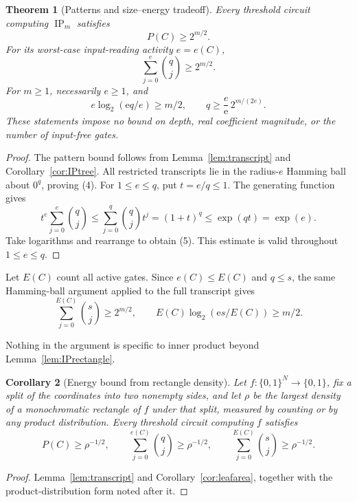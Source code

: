 \documentclass[11pt]{article}
\newtheorem{theorem}{Theorem}[section]
\newtheorem{corollary}[theorem]{Corollary}
\theoremstyle{definition}
\newcommand{\bits}{\{0,1\}}
\newcommand{\ip}{\operatorname{IP}}
\newcommand{\Eul}{\mathrm e}
\begin{document}
\begin{theorem}[Patterns and size--energy tradeoff]\label{thm:energy}
Every threshold circuit computing \(\ip_m\) satisfies
\[
 P(C)\ge2^{m/2}.
\]
For its worst-case input-reading activity \(e=e(C)\),
\[
 \boxed{\quad
 \sum_{j=0}^{e}\binom qj\ge2^{m/2}.
 \quad}                                                  \tag{4}
\]
For \(m\ge1\), necessarily \(e\ge1\), and
\[
 \boxed{\quad
 e\log_2(\Eul q/e)\ge m/2,
 \qquad q\ge\frac e{\Eul}\,2^{m/(2e)}.
 \quad}                                                  \tag{5}
\]
These statements impose no bound on depth, real coefficient magnitude, or the number of input-free gates.
\end{theorem}
\begin{proof}
The pattern bound follows from Lemma~\ref{lem:transcript} and Corollary~\ref{cor:IPtree}.
All restricted transcripts lie in the radius-\(e\) Hamming ball about \(0^q\), proving (4).
For \(1\le e\le q\), put \(t=e/q\le1\). The generating function gives
\[
 t^e\sum_{j=0}^e\binom qj
 \le\sum_{j=0}^q\binom qj t^j
 =(1+t)^q\le \exp(qt)=\exp(e).
\]
Take logarithms and rearrange to obtain (5). This estimate is valid throughout \(1\le e\le q\).
\end{proof}

Let \(E(C)\) count all active gates. Since \(e(C)\le E(C)\) and \(q\le s\), the same Hamming-ball argument applied to the full transcript gives
\[
 \sum_{j=0}^{E(C)}\binom sj\ge2^{m/2},
 \qquad E(C)\log_2(\Eul s/E(C))\ge m/2.                   \tag{6}
\]

Nothing in the argument is specific to inner product beyond Lemma~\ref{lem:IPrectangle}.

\begin{corollary}[Energy bound from rectangle density]\label{cor:energy_general}
Let \(f:\bits^N\to\bits\), fix a split of the coordinates into two nonempty sides, and let \(\rho\) be the largest density of a monochromatic rectangle of \(f\) under that split, measured by counting or by any product distribution. Every threshold circuit computing \(f\) satisfies
\[
 P(C)\ge\rho^{-1/2},\qquad
 \sum_{j=0}^{e(C)}\binom qj\ge\rho^{-1/2},\qquad
 \sum_{j=0}^{E(C)}\binom sj\ge\rho^{-1/2}.
\]
\end{corollary}
\begin{proof}
Lemma~\ref{lem:transcript} and Corollary~\ref{cor:leafarea}, together with the product-distribution form noted after it.
\end{proof}
\end{document}
